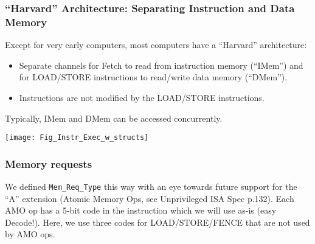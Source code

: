 \begin{frame}[fragile]
\frametitle{``Harvard'' Architecture: Separating Instruction and Data Memory}

\footnotesize

\begin{minipage}{0.35\textwidth}
 Except for very early computers, most computers have a ``Harvard'' architecture:
 \begin{itemize}

  \item Separate channels for Fetch to read from instruction memory (``IMem'')
        and for LOAD/STORE instructions to read/write data memory (``DMem'').

  \item Instructions are not modified by the LOAD/STORE instructions.

 \end{itemize}
 Typically, IMem and DMem can be accessed concurrently.
\end{minipage}
\hm
\begin{minipage}{0.6\textwidth}
 \begin{center}
  \texttt{[image: Fig\_Instr\_Exec\_w\_structs]}
 \end{center}
\end{minipage}

\end{frame}


\begin{frame}[fragile]
\frametitle{Memory requests}

\footnotesize





We defined {\tt Mem\_Req\_Type} this way with an eye towards future
support for the ``A'' extension (Atomic Memory Ops, see Unprivileged
ISA Spec p.132).  Each AMO op has a 5-bit code in the instruction
which we will use as-is (easy Decode!).  Here, we use three codes for
LOAD/STORE/FENCE that are not used by AMO ops.



\end{frame}


